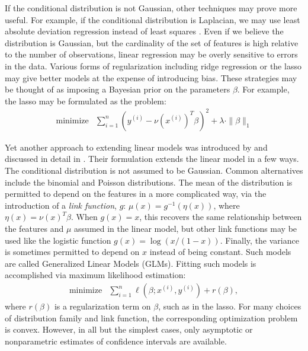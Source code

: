 \documentclass[12pt]{article}
\begin{document}
If the conditional distribution is not Gaussian, other techniques may prove more useful. For example, if the conditional distribution is Laplacian, we may use least absolute deviation regression instead of least squares \cite{Birkes:1993}. Even if we believe the distribution is Gaussian, but the cardinality of the set of features is high relative to the number of observations, linear regression may be overly sensitive to errors in the data. Various forms of regularization including ridge regression or the lasso \cite{Tibs:96} may give better models at the expense of introducing bias. These strategies may be thought of as imposing a Bayesian prior on the parameters $\beta$. For example, the lasso may be formulated as the problem:
\begin{displaymath}
        \begin{array}{ll}
            \mbox{minimize} & \sum_{i=1}^n \left( y^{(i)} - \nu \left(x^{(i)} \right)^T \beta \right)^2 + \lambda \cdot \| \beta \|_1
        \end{array}
\end{displaymath}

Yet another approach to extending linear models was introduced by \cite{NW:72} and discussed in detail in \cite{MN:1983}. Their formulation extends the linear model in a few ways. The conditional distribution is not assumed to be Gaussian. Common alternatives include the binomial and Poisson distributions. The mean of the distribution is permitted to depend on the features in a more complicated way, via the introduction of a \textit{link function}, $g$: $\mu(x) = g^{-1}(\eta(x))$, where $\eta(x) = \nu(x)^T \beta$. When $g(x) = x$, this recovers the same relationship between the features and $\mu$ assumed in the linear model, but other link functions may be used like the logistic function $g(x) = \log(x / (1-x))$. Finally, the variance is sometimes permitted to depend on $x$ instead of being constant. Such models are called Generalized Linear Models (GLMs). Fitting such models is accomplished via maximum likelihood estimation:
\begin{displaymath}
        \begin{array}{ll}
            \mbox{minimize} & \sum_{i=1}^n \ell\left( \beta; x^{(i)}, y^{(i)}\right) + r(\beta),
        \end{array}
\end{displaymath}
where $r(\beta)$ is a regularization term on $\beta$, such as in the lasso. For many choices of distribution family and link function, the corresponding optimization problem is convex. However, in all but the simplest cases, only asymptotic or nonparametric estimates of confidence intervals are available.
\end{document}
